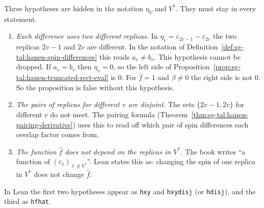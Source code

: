 \begin{remark}\label{rem:sg-tal:hanen-implicit}
Three hypotheses are hidden in the notation $\eta_V$ and $V^*$. They must stay in every statement.
\begin{enumerate}
\item \emph{Each difference uses two different replicas.} In $\eta_v=\varepsilon_{2v-1}-\varepsilon_{2v}$ the two
 replicas $2v-1$ and $2v$ are different. In the notation of Definition~\ref{def:sg-tal:hanen-spin-differences} this reads $a_v\neq b_v$.
 This hypothesis cannot be dropped. If $a_v=b_v$ then $\eta_v=0$, so the left side of Proposition~\ref{prop:sg-tal:hanen-truncated-rect-eval} is $0$.
 For $\hat f=1$ and $\beta\ne0$ the right side is not $0$. So the proposition is false without this hypothesis.
\item \emph{The pairs of replicas for different $v$ are disjoint.} The sets $\{2v-1,2v\}$ for different $v$ do not meet.
 The pairing formula (Theorem~\ref{thm:sg-tal:hanen-pairing-derivative}) uses this to read off which pair of
 spin differences each overlap factor comes from.
\item \emph{The function $\hat f$ does not depend on the replicas in $V^*$.} The book writes
 ``a function of $(\varepsilon_\ell)_{\ell\notin V^*}$''. Lean states this as: changing the spin of one replica in $V^*$ does not change $\hat f$.
\end{enumerate}
In Lean the first two hypotheses appear as \texttt{hxy} and \texttt{hxydisj} (or \texttt{hdisj}), and the third as \texttt{hfhat}.
\end{remark}


